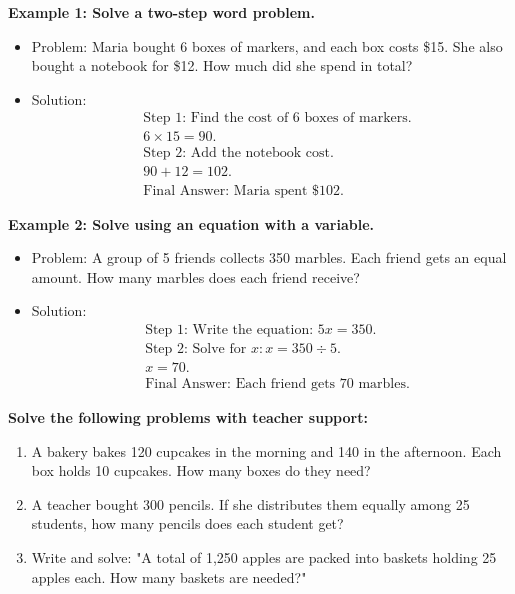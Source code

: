 \documentclass[12pt]{article}
\begin{document}
\begin{tcolorbox}[colframe=black!60, colback=white, 
coltitle=black, colbacktitle=black!15, fonttitle=\bfseries\Large, 
title=Examples, halign title=center, left=10pt, right=10pt, top=10pt, bottom=15pt]
\textbf{Example 1: Solve a two-step word problem.}
\begin{itemize}
    \item Problem: Maria bought 6 boxes of markers, and each box costs \$15. She also bought a notebook for \$12. How much did she spend in total?
    \item Solution:
    \begin{align*}
        & \text{Step 1: Find the cost of 6 boxes of markers.} \\
        & 6 \times 15 = 90. \\
        & \text{Step 2: Add the notebook cost.} \\
        & 90 + 12 = 102. \\
        & \text{Final Answer: Maria spent \$102.}
    \end{align*}
\end{itemize}

\textbf{Example 2: Solve using an equation with a variable.}
\begin{itemize}
    \item Problem: A group of 5 friends collects 350 marbles. Each friend gets an equal amount. How many marbles does each friend receive?
    \item Solution:
    \begin{align*}
        & \text{Step 1: Write the equation: } 5x = 350. \\
        & \text{Step 2: Solve for } x: x = 350 \div 5. \\
        & x = 70. \\
        & \text{Final Answer: Each friend gets 70 marbles.}
    \end{align*}
\end{itemize}
\end{tcolorbox}

\vspace{1em}

\begin{tcolorbox}[colframe=black!60, colback=white, 
coltitle=black, colbacktitle=black!15, fonttitle=\bfseries\Large, 
title=Guided Practice, halign title=center, left=10pt, right=10pt, top=10pt, bottom=15pt]
\textbf{Solve the following problems with teacher support:}
\begin{enumerate}[itemsep=4em]
    \item A bakery bakes 120 cupcakes in the morning and 140 in the afternoon. Each box holds 10 cupcakes. How many boxes do they need?
    \item A teacher bought 300 pencils. If she distributes them equally among 25 students, how many pencils does each student get?
    \item Write and solve: "A total of 1,250 apples are packed into baskets holding 25 apples each. How many baskets are needed?"
\end{enumerate}
\end{tcolorbox}
\end{document}
